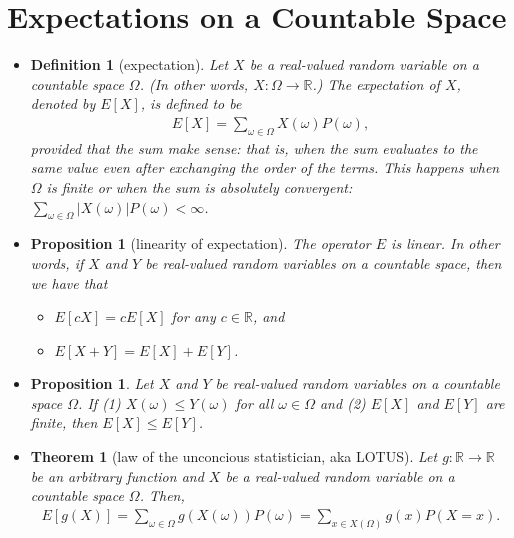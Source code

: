 \documentclass[10pt]{article}
\newtheorem{theorem}[lemma]{Theorem}
\newtheorem{definition}[lemma]{Definition}
\newtheorem{proposition}[lemma]{Proposition}
\numberwithin{lemma}{section}
\newcommand{\Real}{\mathbb{R}}
\begin{document}
\section{Expectations on a Countable Space}

\begin{itemize}
  \item \begin{definition}[expectation]
    Let $X$ be a real-valued random variable on a countable space $\Omega$. (In other words, $X: \Omega \rightarrow \Real$.) The expectation of $X$, denoted by $E[X]$, is defined to be
    \begin{align*}
      E[X] = \sum_{\omega \in \Omega} X(\omega) P(\omega),
    \end{align*}
    provided that the sum make sense: that is, when the sum evaluates to the same value even after exchanging the order of the terms. This happens when $\Omega$ is finite or when the sum is absolutely convergent: $\sum_{\omega \in \Omega} |X(\omega)| P(\omega) < \infty$. 
  \end{definition}

  \item \begin{proposition}[linearity of expectation]
    The operator $E$ is linear. In other words, if $X$ and $Y$ be real-valued random variables on a countable space, then we have that 
    \begin{itemize}
      \item $E[cX] = cE[X]$ for any $c \in \Real$, and
      \item $E[X+Y] = E[X] + E[Y]$.
    \end{itemize}
  \end{proposition}

  \item \begin{proposition}
    Let $X$ and $Y$ be real-valued random variables on a countable space $\Omega$. If (1) $X(\omega) \leq Y(\omega)$ for all $\omega \in \Omega$ and (2) $E[X]$ and $E[Y]$ are finite, then $E[X] \leq E[Y]$.
  \end{proposition}

  \item \begin{theorem}[law of the unconcious statistician, aka LOTUS] \label{thm:lotus-v1}
    Let $g: \Real \rightarrow \Real$ be an arbitrary function and $X$ be a real-valued random variable on a countable space $\Omega$. Then,
    \begin{align*}
      E[g(X)] = \sum_{\omega \in \Omega} g(X(\omega))P(\omega) = \sum_{x \in X(\Omega)} g(x) P(X = x). 
    \end{align*}
  \end{theorem}


\end{itemize}
\end{document}
